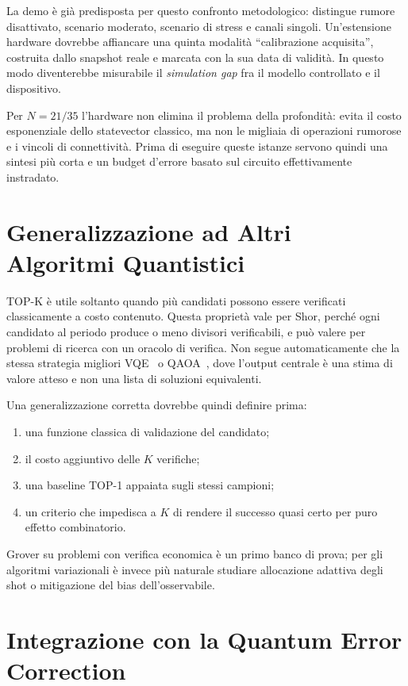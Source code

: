 \begin{onehalfspace}
La demo è già predisposta per questo confronto metodologico: distingue
rumore disattivato, scenario moderato, scenario di stress e canali
singoli. Un'estensione hardware dovrebbe affiancare una quinta modalità
``calibrazione acquisita'', costruita dallo snapshot reale e marcata con
la sua data di validità. In questo modo diventerebbe misurabile il
\emph{simulation gap} fra il modello controllato e il dispositivo.

Per $N=21/35$ l'hardware non elimina il problema della profondità: evita
il costo esponenziale dello statevector classico, ma non le migliaia di
operazioni rumorose e i vincoli di connettività. Prima di eseguire queste
istanze servono quindi una sintesi più corta e un budget d'errore basato
sul circuito effettivamente instradato.

\section{Generalizzazione ad Altri Algoritmi Quantistici}
\label{sec:altri_algoritmi}

TOP-K è utile soltanto quando più candidati possono essere verificati
classicamente a costo contenuto. Questa proprietà vale per Shor, perché
ogni candidato al periodo produce o meno divisori verificabili, e può
valere per problemi di ricerca con un oracolo di verifica. Non segue
automaticamente che la stessa strategia migliori VQE~\cite{peruzzo2014} o
QAOA~\cite{farhi2014}, dove
l'output centrale è una stima di valore atteso e non una lista di
soluzioni equivalenti.

Una generalizzazione corretta dovrebbe quindi definire prima:
\begin{enumerate}
    \item una funzione classica di validazione del candidato;
    \item il costo aggiuntivo delle $K$ verifiche;
    \item una baseline TOP-1 appaiata sugli stessi campioni;
    \item un criterio che impedisca a $K$ di rendere il successo quasi
    certo per puro effetto combinatorio.
\end{enumerate}
Grover su problemi con verifica economica è un primo banco di prova;
per gli algoritmi variazionali è invece più naturale studiare
allocazione adattiva degli shot o mitigazione del bias dell'osservabile.

\section{Integrazione con la Quantum Error Correction}
\label{sec:qec_integrazione}


\end{onehalfspace}
